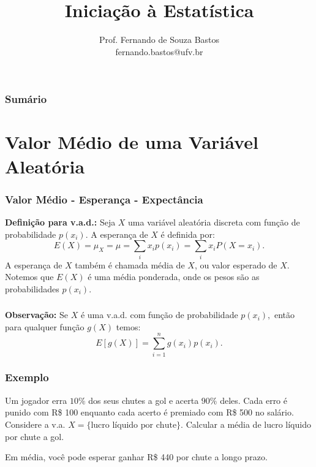 \documentclass[14pt,aspectratio=1610]{beamer}
\title{Iniciação à Estatística}
\author{Prof. Fernando de Souza Bastos \texorpdfstring{\\ fernando.bastos@ufv.br}{}}
\institute{Departamento de Estatística \texorpdfstring{\\ Universidade Federal de Viçosa}{}\texorpdfstring{\\ Campus UFV - Viçosa}{}}
\date{}
\begin{document}
%

\frame{\titlepage}

\begin{frame}{}
\frametitle{\bf Sumário}
\tableofcontents
\end{frame}

\section{Valor Médio de uma Variável Aleatória}
\begin{frame}{}
\frametitle{Valor Médio - Esperança - Expectância}
\begin{block}{}
\justifying
\textbf{Definição para v.a.d.:} Seja $X$ uma variável aleatória discreta com função de probabilidade $p(x_{i})$. A esperança de $X$ é definida por: 
$$\displaystyle E(X)=\mu_{X}=\mu=\sum_{i}x_{i}p(x_{i})=\sum_{i}x_{i}P(X=x_{i}).$$ A esperança de $X$ também é chamada média de $X$, ou valor esperado de $X$. 
Notemos que $E(X)$ é uma média ponderada, onde os pesos são as probabilidades $p(x_{i}).$
\end{block}
\end{frame}

\begin{frame}{}
\frametitle{}
\begin{block}{}
\justifying
\textbf{Observação:} Se $X$ é uma v.a.d. com função de probabilidade $p(x_{i}),$ então para qualquer função $g(X)$ temos: 
$$\displaystyle E[g(X)]=\sum_{i=1}^{n}g(x_{i})p(x_{i}).$$
\end{block}
\end{frame}

\begin{frame}{}
\frametitle{Exemplo}
\begin{block}{}
\justifying
Um jogador erra $10\%$ dos seus chutes a gol e acerta $90\%$ deles. Cada erro é punido com R\$ 100 enquanto cada acerto é premiado com R\$ 500 no salário. Considere a v.a. $X=\{\textrm{lucro líquido por chute}\}.$ Calcular a média de lucro líquido por chute a gol.
\end{block}
\pause
\begin{block}{}
\justifying
Em média, você pode esperar ganhar R\$ 440 por chute a longo prazo.
\end{block}
\end{frame}
\end{document}
